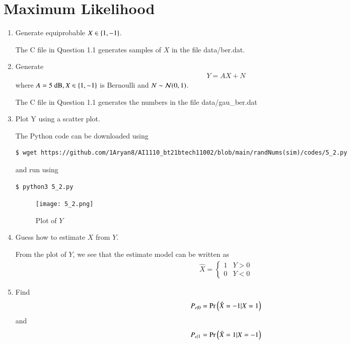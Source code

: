 \documentclass[journal,12pt,twocolumn]{IEEEtran}
\renewcommand\thesection{\arabic{section}}
\begin{document}
\section{Maximum Likelihood}
\begin{enumerate}[label=\thesection.\arabic*
,ref=\thesection.\theenumi]

\item Generate equiprobable $X \in \left\{1, -1\right\}$.

\solution
The C file in Question 1.1 generates samples of $X$ in the file data/ber.dat.
\item Generate 
	\begin{align}
		Y = AX + N
	\end{align}
where $A  = 5 \text{ dB}, X \in \left\{1, -1\right\}$ is Bernoulli and $N \sim \mathcal{N}(0, 1)$.

\solution
The C file in Question 1.1 generates the numbers in the file data/gau\_ber.dat

\item Plot Y using a scatter plot.

\solution
The Python code can be downloaded using
\begin{lstlisting}
$ wget https://github.com/1Aryan8/AI1110_bt21btech11002/blob/main/randNums(sim)/codes/5_2.py
\end{lstlisting}
and run using
\begin{lstlisting}
$ python3 5_2.py
\end{lstlisting}
\begin{figure}[!htb]
	\texttt{[image: 5\_2.png]}
	\caption{Plot of $Y$}
	\label{fig:wave}
\end{figure}

\item Guess how to estimate $X$ from $Y$.

\solution
From the plot of $Y$, we see that the estimate model can be written as
\begin{align}
	\hat{X} = 
	\begin{cases}
		1 & Y > 0 \\
		0 & Y < 0
	\end{cases}
\end{align}

\item Find 
	\begin{align}
		P_{e|0} = \Pr\left(\hat{X} = -1|X = 1\right)
	\end{align}
and
	\begin{align}
		P_{e|1} = \Pr\left(\hat{X} = 1|X = -1\right)
	\end{align}
	

\end{enumerate}
\end{document}
